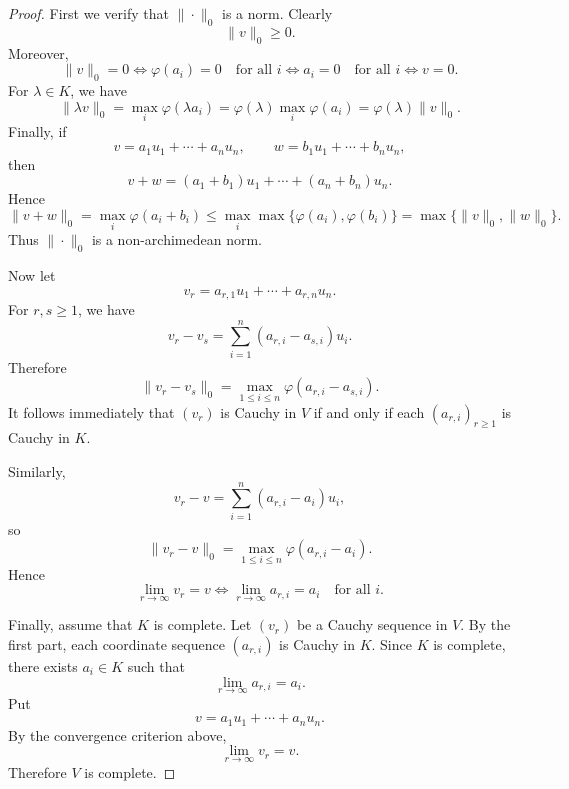 \begin{proof}
    First we verify that \(\|\cdot\|_0\) is a norm. Clearly
    \[
        \|v\|_0\geq 0.
    \]
    Moreover,
    \[
        \|v\|_0=0
        \Longleftrightarrow
        \varphi(a_i)=0\quad\text{for all }i
        \Longleftrightarrow
        a_i=0\quad\text{for all }i
        \Longleftrightarrow
        v=0.
    \]
    For \(\lambda\in K\), we have
    \[
        \|\lambda v\|_0
        =
        \max_i \varphi(\lambda a_i)
        =
        \varphi(\lambda)\max_i\varphi(a_i)
        =
        \varphi(\lambda)\|v\|_0.
    \]
    Finally, if
    \[
        v=a_1u_1+\cdots+a_nu_n,\qquad
        w=b_1u_1+\cdots+b_nu_n,
    \]
    then
    \[
        v+w=(a_1+b_1)u_1+\cdots+(a_n+b_n)u_n.
    \]
    Hence
    \[
        \|v+w\|_0
        =
        \max_i\varphi(a_i+b_i)
        \leq
        \max_i\max\{\varphi(a_i),\varphi(b_i)\}
        =
        \max\{\|v\|_0,\|w\|_0\}.
    \]
    Thus \(\|\cdot\|_0\) is a non-archimedean norm.

    Now let
    \[
        v_r=a_{r,1}u_1+\cdots+a_{r,n}u_n.
    \]
    For \(r,s\geq 1\), we have
    \[
        v_r-v_s
        =
        \sum_{i=1}^n (a_{r,i}-a_{s,i})u_i.
    \]
    Therefore
    \[
        \|v_r-v_s\|_0
        =
        \max_{1\leq i\leq n}
        \varphi(a_{r,i}-a_{s,i}).
    \]
    It follows immediately that \((v_r)\) is Cauchy in \(V\) if and only if each
    \((a_{r,i})_{r\geq 1}\) is Cauchy in \(K\).

    Similarly,
    \[
        v_r-v
        =
        \sum_{i=1}^n (a_{r,i}-a_i)u_i,
    \]
    so
    \[
        \|v_r-v\|_0
        =
        \max_{1\leq i\leq n}
        \varphi(a_{r,i}-a_i).
    \]
    Hence
    \[
        \lim_{r\to\infty} v_r=v
        \Longleftrightarrow
        \lim_{r\to\infty} a_{r,i}=a_i
        \quad\text{for all }i.
    \]

    Finally, assume that \(K\) is complete. Let \((v_r)\) be a Cauchy sequence in
    \(V\). By the first part, each coordinate sequence \((a_{r,i})\) is Cauchy in
    \(K\). Since \(K\) is complete, there exists \(a_i\in K\) such that
    \[
        \lim_{r\to\infty}a_{r,i}=a_i.
    \]
    Put
    \[
        v=a_1u_1+\cdots+a_nu_n.
    \]
    By the convergence criterion above,
    \[
        \lim_{r\to\infty}v_r=v.
    \]
    Therefore \(V\) is complete.
\end{proof}

